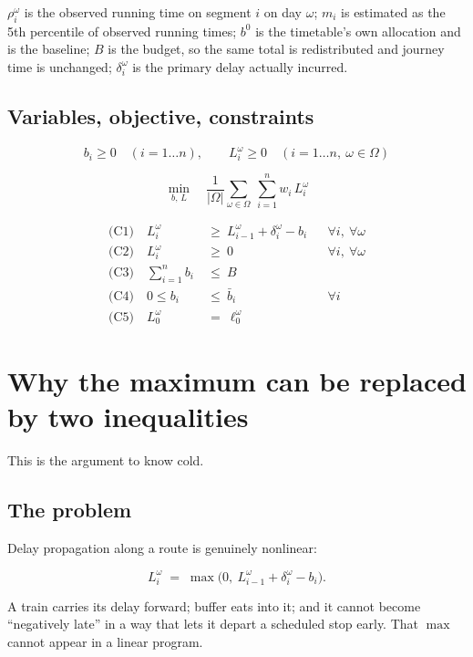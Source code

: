 \documentclass[11pt,a4paper]{article}
\begin{document}
$\rho_i^\omega$ is the observed running time on segment $i$ on day $\omega$; $m_i$ is
estimated as the 5th percentile of observed running times; $b^0$ is the timetable's own
allocation and is the baseline; $B$ is the budget, so the same total is redistributed and
journey time is unchanged; $\delta_i^\omega$ is the primary delay actually incurred.

\subsection*{Variables, objective, constraints}

\[
b_i \ge 0 \quad (i = 1 \dots n), \qquad L_i^\omega \ge 0 \quad (i = 1 \dots n,\ \omega \in \Omega)
\]

\[
\min_{b,\,L}\quad \frac{1}{|\Omega|}\sum_{\omega \in \Omega}\ \sum_{i=1}^{n} w_i\, L_i^\omega
\]

\[
\begin{aligned}
\text{(C1)}\quad L_i^\omega &\ \ge\ L_{i-1}^\omega + \delta_i^\omega - b_i && \forall i,\ \forall \omega \\
\text{(C2)}\quad L_i^\omega &\ \ge\ 0 && \forall i,\ \forall \omega \\
\text{(C3)}\quad \textstyle\sum_{i=1}^{n} b_i &\ \le\ B \\
\text{(C4)}\quad 0 \le b_i &\ \le\ \bar b_i && \forall i \\
\text{(C5)}\quad L_0^\omega &\ =\ \ell_0^\omega
\end{aligned}
\]

\section{Why the maximum can be replaced by two inequalities}

This is the argument to know cold.

\subsection*{The problem}

Delay propagation along a route is genuinely nonlinear:

\[
L_i^\omega \;=\; \max\!\bigl(0,\ L_{i-1}^\omega + \delta_i^\omega - b_i\bigr).
\]

A train carries its delay forward; buffer eats into it; and it cannot become
``negatively late'' in a way that lets it depart a scheduled stop early. That $\max$ cannot
appear in a linear program.
\end{document}
